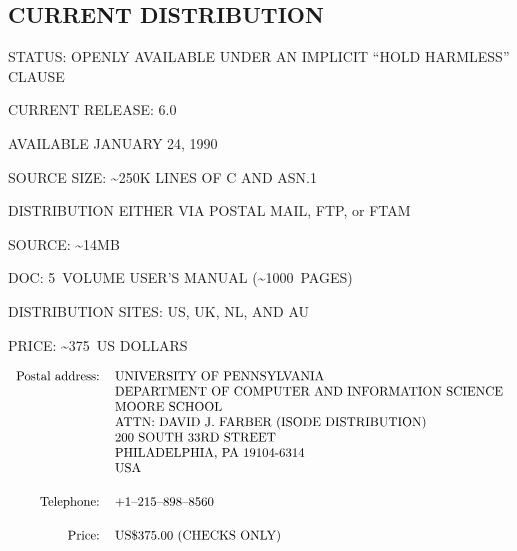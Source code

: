 \begin{bwslide}
\part*	{CURRENT DISTRIBUTION}\bf

\begin{nrtc}
\item	STATUS: OPENLY AVAILABLE UNDER AN IMPLICIT ``HOLD HARMLESS'' CLAUSE

\item	CURRENT RELEASE: 6.0
    \begin{nrtc}
    \item	AVAILABLE JANUARY 24, 1990
    \end{nrtc}

\item	SOURCE SIZE: \~{}250K LINES OF C AND ASN.1
\end{nrtc}
\end{bwslide}


\begin{bwslide}

\begin{nrtc}
\item	DISTRIBUTION EITHER VIA POSTAL MAIL, FTP, or FTAM
    \begin{nrtc}
    \item	SOURCE: \~{}14MB

    \item	DOC: 5~VOLUME USER'S MANUAL (\~{}1000~PAGES)

    \item	DISTRIBUTION SITES: US, UK, NL, AND AU

    \item	PRICE: \~{}375~US DOLLARS
    \end{nrtc}
\end{nrtc}
\end{bwslide}


\begin{bwslide}
\small

\[\begin{tabular}{rl}
Postal address:&UNIVERSITY OF PENNSYLVANIA\\
&		DEPARTMENT OF COMPUTER AND INFORMATION SCIENCE\\
&		MOORE SCHOOL\\
&		ATTN: DAVID J. FARBER (ISODE DISTRIBUTION)\\
&		200 SOUTH 33RD STREET\\
&		PHILADELPHIA, PA 19104-6314\\
&		USA\\[0.2in]
Telephone:&	+1--215--898--8560\\[0.2in]
Price:&		US\$375.00 (CHECKS ONLY)
\end{tabular}\]
\end{bwslide}


